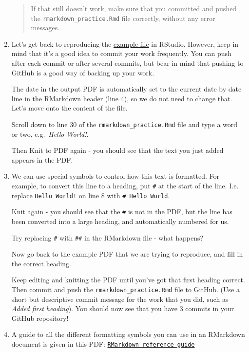\documentclass[
]{article}
\begin{document}
\begin{enumerate}
\begin{quote}
  If that still doesn't work, make sure that you committed and pushed
  the \texttt{rmarkdown\_practice.Rmd} file correctly, without any error
  messages.
  \end{quote}
\item
  Let's get back to reproducing the
  \href{https://gmuedu-my.sharepoint.com/:b:/g/personal/dwhite34_gmu_edu/ESKWurLFXaFKnqnAo-krkXEBPP6h7gz9Fe-JIVPJCjzEhg?e=92BgLP}{example
  file} in RStudio. However, keep in mind that it's a good idea to
  commit your work frequently. You can push after each commit or after
  several commits, but bear in mind that pushing to GitHub is a good way
  of backing up your work.

  The date in the output PDF is automatically set to the current date by
  date line in the RMarkdown header (line 4), so we do not need to
  change that. Let's move onto the content of the file.

  Scroll down to line 30 of the \texttt{rmarkdown\_practice.Rmd} file
  and type a word or two, e.g.~\emph{Hello World!}.

  Then Knit to PDF again - you should see that the text you just added
  appears in the PDF.
\item
  We can use special symbols to control how this text is formatted. For
  example, to convert this line to a heading, put \texttt{\#} at the
  start of the line. I.e. replace \texttt{Hello\ World!} on line 8 with
  \texttt{\#\ Hello\ World}.

  Knit again - you should see that the \texttt{\#} is not in the PDF,
  but the line has been converted into a large heading, and
  automatically numbered for us.

  Try replacing \texttt{\#} with \texttt{\#\#} in the RMarkdown file -
  what happens?

  Now go back to the example PDF that we are trying to reproduce, and
  fill in the correct heading.

  Keep editing and knitting the PDF until you've got that first heading
  correct. Then commit and push the \texttt{rmarkdown\_practice.Rmd}
  file to GitHub. (Use a short but descriptive commit message for the
  work that you did, such as \emph{Added first heading}). You should now
  see that you have 3 commits in your GitHub repository!
\item
  A guide to all the different formatting symbols you can use in an
  RMarkdown document is given in this PDF:
  \href{https://www.rstudio.com/wp-content/uploads/2015/03/rmarkdown-reference.pdf}{\texttt{RMarkdown\ reference\ guide}}


\end{enumerate}
\end{document}
